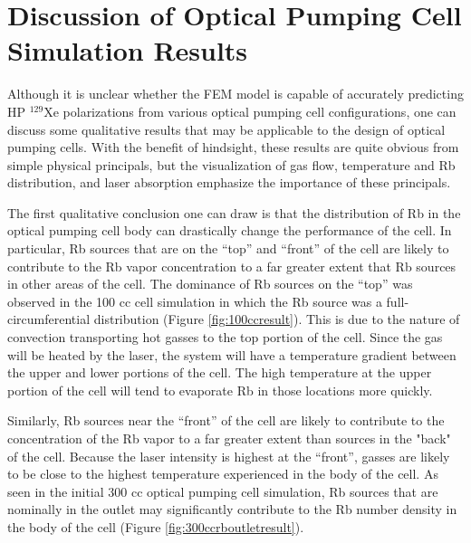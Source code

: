 \section{Discussion of Optical Pumping Cell Simulation Results\label{sec:discusion}}
Although it is unclear whether the FEM model is capable of accurately predicting HP $^{129}$Xe polarizations from various optical pumping cell configurations, one can discuss some qualitative results that may be applicable to the design of optical pumping cells. With the benefit of hindsight, these results are quite obvious from simple physical principals, but the visualization of gas flow, temperature and Rb distribution, and laser absorption emphasize the importance of these principals.

The first qualitative conclusion one can draw is that the distribution of Rb in the optical pumping cell body can drastically change the performance of the cell. In particular, Rb sources that are on the ``top'' and ``front'' of the cell are likely to contribute to the Rb vapor concentration to a far greater extent that Rb sources in other areas of the cell. The dominance of Rb sources on the ``top'' was observed in the 100 cc cell simulation in which the Rb source was a full-circumferential distribution (Figure \ref{fig:100ccresult}). This is due to the nature of convection transporting hot gasses to the top portion of the cell. Since the gas will be heated by the laser, the system will have a temperature gradient between the upper and lower portions of the cell. The high temperature at the upper portion of the cell will tend to evaporate Rb in those locations more quickly.

Similarly, Rb sources near the ``front'' of the cell are likely to contribute to the concentration of the Rb vapor to a far greater extent than sources in the "back" of the cell. Because the laser intensity is highest at the ``front'', gasses are likely to be close to the highest temperature experienced in the body of the cell. As seen in the initial 300 cc optical pumping cell simulation, Rb sources that are nominally in the outlet may significantly contribute to the Rb number density in the body of the cell (Figure \ref{fig:300ccrboutletresult}).

